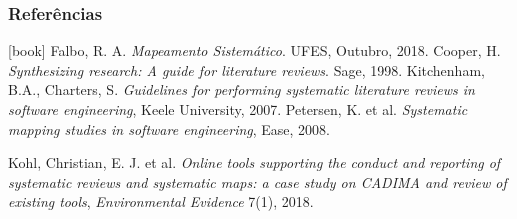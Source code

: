 \begin{frame}[allowframebreaks]
\frametitle{Referências}
\begin{thebibliography}{9}
[book]
%
Falbo, R. A. \textit{Mapeamento Sistemático}. UFES, Outubro, 2018.
%
Cooper, H. \textit{Synthesizing research: A guide for literature reviews}. Sage, 1998.
%
Kitchenham, B.A., Charters, S. \textit{Guidelines for performing systematic literature reviews in  software engineering}, Keele University, 2007.
%
Petersen, K. et al. \textit{Systematic mapping studies in software engineering}, Ease, 2008.

Kohl, Christian, E. J. et al. \textit{Online tools supporting the conduct and reporting of systematic reviews and systematic maps: a case study on CADIMA and review of existing tools}, \textit{Environmental Evidence} 7(1), 2018.

\end{thebibliography}
\end{frame}